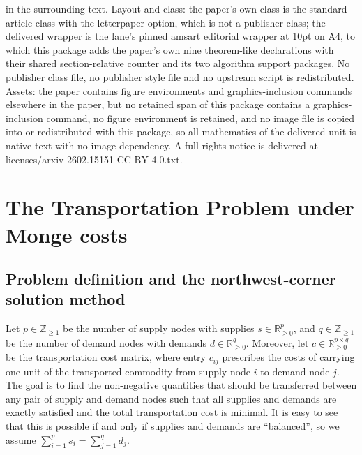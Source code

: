 \documentclass[10pt,a4paper]{amsart}
\begin{document}
in the surrounding text. Layout and class: the paper's own class is the standard article class with the letterpaper option, which is not a publisher class; the delivered wrapper is the lane's pinned amsart editorial wrapper at 10pt on A4, to which this package adds the paper's own nine theorem-like declarations with their shared section-relative counter and its two algorithm support packages. No publisher class file, no publisher style file and no upstream script is redistributed. Assets: the paper contains figure environments and graphics-inclusion commands elsewhere in the paper, but no retained span of this package contains a graphics-inclusion command, no figure environment is retained, and no image file is copied into or redistributed with this package, so all mathematics of the delivered unit is native text with no image dependency. A full rights notice is delivered at licenses/arxiv-2602.15151-CC-BY-4.0.txt.
\setcounter{section}{1}
\section{The Transportation Problem under Monge costs}\label{sec:transportation}

\subsection{Problem definition and the northwest-corner solution method}\label{sec:TP_definition}
Let $p \in \mathbb{Z}_{\geq 1}$ be the number of supply nodes with supplies $s \in \mathbb{R}_{\geq 0}^p$, and $q \in \mathbb{Z}_{\geq 1}$ be the number of demand nodes with demands $d \in \mathbb{R}_{\geq 0}^q$. Moreover, let $c \in \mathbb{R}_{\geq 0}^{p \times q}$ be the transportation cost matrix, where entry $c_{ij}$ prescribes the costs of carrying one unit of the transported commodity from supply node $i$ to demand node $j$. The goal is to find the non-negative quantities that should be transferred between any pair of supply and demand nodes such that all supplies and demands are exactly satisfied and the total transportation cost is minimal. It is easy to see that this is possible if and only if supplies and demands are \enquote{balanced}, so we assume $\sum_{i = 1}^p s_i = \sum_{j = 1}^q d_j$.
\end{document}
